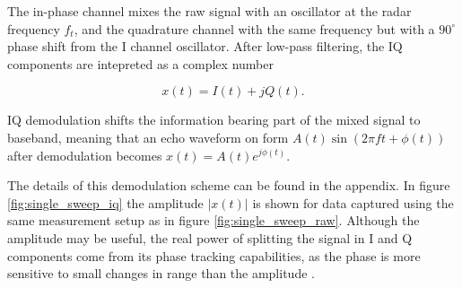The in-phase channel mixes the raw signal with an oscillator at the radar frequency $f_t$, and the quadrature channel with the same frequency but with a $90^\circ$ phase shift from the I channel oscillator. After low-pass filtering, the IQ components are intepreted as a complex number

\begin{equation}
	x(t) = I(t) + jQ(t).
\end{equation}

IQ demodulation shifts the information bearing part of the mixed signal to baseband, meaning that an echo waveform on form $A(t)\sin(2\pi f t + \phi(t))$ after demodulation becomes $x(t) = A(t)e^{j\phi(t)}$.

The details of this demodulation scheme can be found in the appendix. In figure \ref{fig:single_sweep_iq} the amplitude $|x(t)|$ is shown for data captured using the same measurement setup as in figure \ref{fig:single_sweep_raw}. Although the amplitude may be useful, the real power of splitting the signal in I and Q components come from its phase tracking capabilities, as the phase is more sensitive to small changes in range than the amplitude \citep{lien_gillian_karagozler_amihood_schwesig_olson_raja_poupyrev_2016}.





